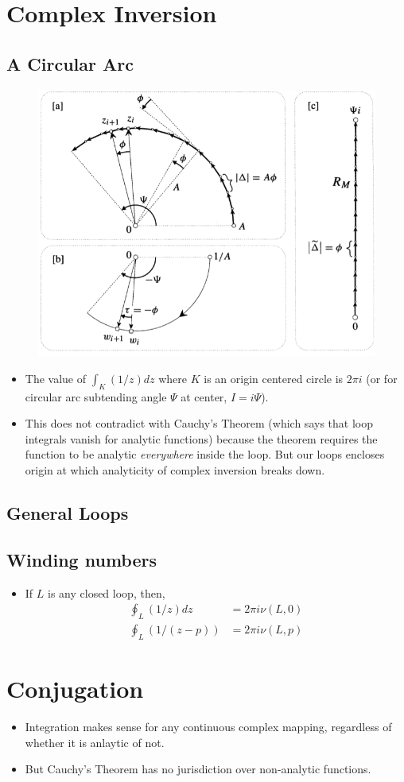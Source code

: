 \documentclass[12pt]{article}
\def\tt{\textit}
\begin{document}
\section{Complex Inversion}
\subsection{A Circular Arc}
\begin{figure}[h!]
    \centering
    \includegraphics[scale=0.7]{fig_5}
    \label{f5}
\end{figure}
\begin{itemize}
    \item The value of $\int_{K}(1/z)dz$ where $K$ is an origin centered circle is $2\pi i$ (or for circular arc subtending angle $\Psi$ at center, $I=i\Psi$).
    \item This does not contradict with Cauchy's Theorem (which says that loop integrals vanish for analytic functions) because the theorem requires the function to be analytic \tt{everywhere} inside the loop. But our loops encloses origin at which analyticity of complex inversion breaks down.
\end{itemize}
\subsection{General Loops}
\subsection{Winding numbers}
\begin{itemize}
    \item If $L$ is any closed loop, then,
    \begin{align*}
        \oint_{L}(1/z)dz &= 2\pi i \nu(L,0)\\
        \oint_{L}(1/(z-p)) &= 2\pi i \nu(L,p)
    \end{align*}
\end{itemize}
\section{Conjugation}
\begin{itemize}
    \item Integration makes sense for any continuous complex mapping, regardless of whether it is anlaytic of not.
    \item But Cauchy's Theorem has no jurisdiction over non-analytic functions.
\end{itemize}
\end{document}
